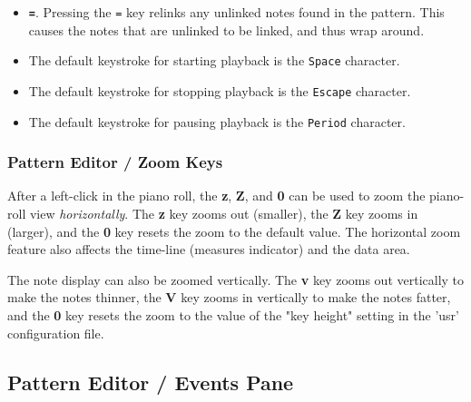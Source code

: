 \begin{itemize}
         the pattern.
         This fix is a stop-gap until we can figure out
         the best way to prevent unlinked notes while handling recording of
         notes near the end of the pattern length.
      \item
         \textbf{\texttt{=}}.
         Pressing the \texttt{=} key relinks any unlinked notes found in
         the pattern. This causes the notes that are unlinked to be linked, and
         thus wrap around.
      \item
         The default keystroke for starting playback is the \texttt{Space}
         character.
      \item
         The default keystroke for stopping playback is the \texttt{Escape}
         character.
      \item
         The default keystroke for pausing playback is the \texttt{Period}
         character.
   \end{itemize}

\subsubsection{Pattern Editor / Zoom Keys}
\label{subsubsec:pattern_editor_zoom_keys}

   After a left-click in the piano roll, the
   \textbf{z}, \textbf{Z}, and \textbf{0}
   can be used to zoom the piano-roll view \textsl{horizontally}.
   The \textbf{z} key zooms out (smaller),
   the \textbf{Z} key zooms in (larger),
   and the \textbf{0} key resets the zoom to the default value.
   The horizontal zoom feature also affects the time-line
   (measures indicator) and the data area.

   The note display can also be zoomed vertically.
   The \textbf{v} key zooms out vertically to make the notes thinner,
   the \textbf{V} key zooms in vertically to make the notes fatter,
   and the \textbf{0} key resets the zoom to the value of the "key height"
   setting in the 'usr' configuration file.
 
\subsection{Pattern Editor / Events Pane}
\label{subsec:pattern_editor_events_pane}

